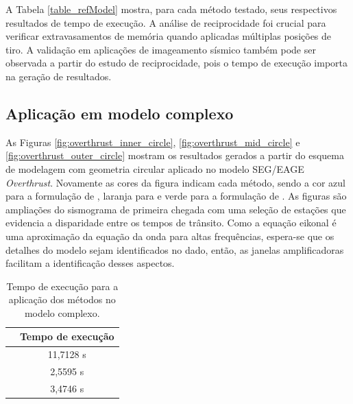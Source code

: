 

A Tabela \ref{table_refModel} mostra, para cada método testado, seus respectivos resultados de tempo de execução. A análise de reciprocidade foi crucial para verificar extravasamentos de memória quando aplicadas múltiplas posições de tiro. A validação em aplicações de imageamento sísmico também pode ser observada a partir do estudo de reciprocidade, pois o tempo de execução importa na geração de resultados.  



\subsection{Aplicação em modelo complexo}

As Figuras \ref{fig:overthrust_inner_circle}, \ref{fig:overthrust_mid_circle} e \ref{fig:overthrust_outer_circle} mostram os resultados gerados a partir do esquema de modelagem com geometria circular aplicado no modelo SEG/EAGE \textit{Overthrust}. Novamente as cores da figura indicam cada método, sendo a cor azul para a formulação de , laranja para  e verde para a formulação de . As figuras são ampliações do sismograma de primeira chegada com uma seleção de estações que evidencia a disparidade entre os tempos de trânsito. Como a equação eikonal é uma aproximação da equação da onda para altas frequências, espera-se que os detalhes do modelo sejam identificados no dado, então, as janelas amplificadoras facilitam a identificação desses aspectos.    

\begin{table}[H]
	\caption{Tempo de execução para a aplicação dos métodos no modelo complexo.}
	\begin{tabular}{r|c}
		& Tempo de execução \\ \hline
		\citeonline{podvin1991finite} & 11,7128 s  \\ \hline
		\citeonline{jeong2008fast} & 2,5595 s      \\ \hline
		\citeonline{noble2014accurate} & 3,4746 s         
	\end{tabular}
	\label{table_overthrust}
\end{table}

